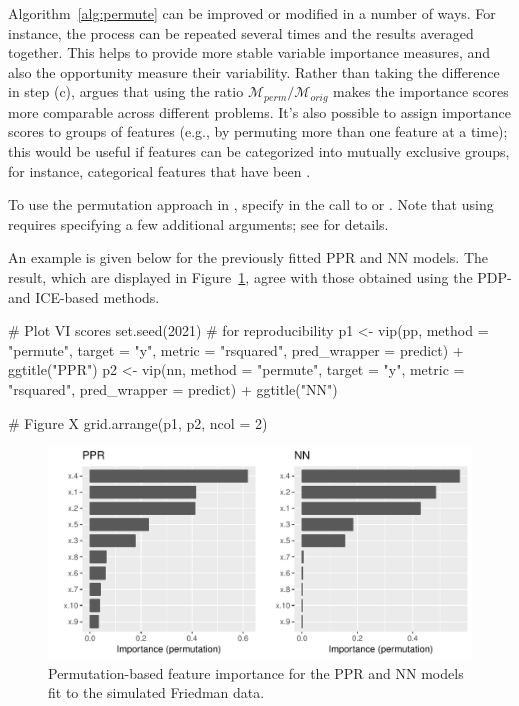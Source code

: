 Algorithm~\ref{alg:permute} can be improved or modified in a number of ways. For instance, the process can be repeated several times and the results averaged together. This helps to provide more stable variable importance measures, and also the opportunity measure their variability. Rather than taking the difference in step (c), \citet[sec 5.5.4]{molnar-2019-iml} argues that using the ratio $\mathcal{M}_{perm} / \mathcal{M}_{orig}$ makes the importance scores more comparable across different problems. It's also possible to assign importance scores to groups of features (e.g., by permuting more than one feature at a time); this would be useful if features can be categorized into mutually exclusive groups, for instance, categorical features that have been .

To use the permutation approach in , specify  in the call to  or . Note that using  requires specifying a few additional arguments; see  for details.

An example is given below for the previously fitted PPR and NN models. The result, which are displayed in Figure~\ref{fig:vip-permute-ppr-nn}, agree with those obtained using the PDP- and ICE-based methods.

\begin{example}
# Plot VI scores
set.seed(2021)  # for reproducibility
p1 <- vip(pp, method = "permute", target = "y", metric = "rsquared",
          pred_wrapper = predict) + ggtitle("PPR")
p2 <- vip(nn, method = "permute", target = "y", metric = "rsquared",
          pred_wrapper = predict) + ggtitle("NN")

# Figure X
grid.arrange(p1, p2, ncol = 2)
\end{example}

\begin{figure}[!htb]
  \centering 
  \includegraphics[width=1\linewidth]{figures/vip-permute-ppr-nn} 
  \caption{Permutation-based feature importance for the PPR and NN models fit to the simulated Friedman data.}
  \label{fig:vip-permute-ppr-nn}
\end{figure}

